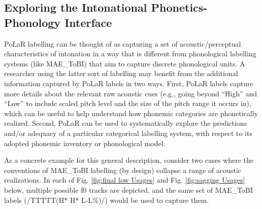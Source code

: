 \documentclass[11pt, twoside]{memoir}
\begin{document}
\subsection{Exploring the Intonational Phonetics-Phonology Interface}\label{sec:exploring-phonetics-phonology-interface}
PoLaR labelling can be thought of as capturing a set of acoustic\slash perceptual characteristics of intonation in a way that is different from phonological labelling systems (like MAE\_ToBI) that aim to capture discrete phonological units. A researcher using the latter sort of labelling may benefit from the additional information captured by PoLaR labels in two ways. First, PoLaR labels capture more details about the relevant raw acoustic cues (e.g., going beyond “High” and “Low” to include scaled pitch level and the size of the pitch range it occurs in), which can be useful to help understand how phonemic categories are phonetically realized. Second, PoLaR can be used to systematically explore the predictions and/or adequacy of a particular categorical labelling system, with respect to its adopted phonemic inventory or phonological model.

As a concrete example for this general description, consider two cases where the conventions of MAE\_ToBI labelling (by design) collapse a range of acoustic realizations. In each of Fig. \ref{fig:final low Usages} and Fig. \ref{fig:sagging Usages} below, multiple possible f0 tracks are depicted, and the same set of MAE\_ToBI labels (/TTTTT(H* H* L-L\%)/) would be used to capture them.
\end{document}
